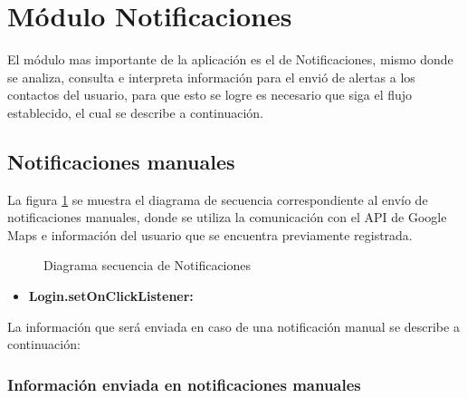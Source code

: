 
\section{Módulo Notificaciones}
El módulo mas importante de la aplicación es el de Notificaciones, mismo donde se analiza, consulta e interpreta información para el envió de alertas a los contactos del usuario, para que esto se logre es necesario que siga el flujo establecido, el cual se describe a continuación.\\


\subsection{Notificaciones manuales}

La figura \ref{fig:Notificaciones} se muestra el diagrama de secuencia correspondiente al envío de notificaciones manuales, donde se utiliza la comunicación con el API de Google Maps e información del usuario que se encuentra previamente registrada.

\begin{figure}[htbp!]
	\centering
	\caption{Diagrama secuencia de Notificaciones}
	\label{fig:Notificaciones}
\end{figure}
\begin{itemize}
	\item \textbf{Login.setOnClickListener:} 
\end{itemize}

La información que será enviada en caso de una notificación manual se describe a continuación:

\subsubsection{Información enviada en notificaciones manuales}

